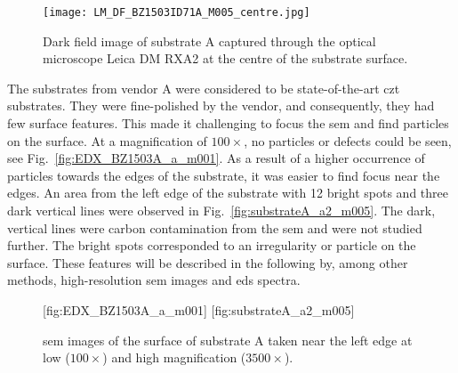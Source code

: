 \begin{figure}[htbp]
    \centering
    \texttt{[image: LM\_DF\_BZ1503ID71A\_M005\_centre.jpg]}
    \caption[Dark field image of substrate A.]{Dark field image of substrate A captured through the optical microscope Leica DM RXA2 at the centre of the substrate surface.}%
    \label{fig:subAa_om_df}
\end{figure}

The substrates from vendor A were considered to be state-of-the-art \ac{czt} substrates. They were fine-polished by the vendor, and consequently, they had few surface features. This made it challenging to focus the \ac{sem} and find particles on the surface. At a magnification of $100\times$, no particles or defects could be seen, see Fig.~\ref{fig:EDX_BZ1503A_a_m001}. As a result of a higher occurrence of particles towards the edges of the substrate, it was easier to find focus near the edges. An area from the left edge of the substrate with 12 bright spots and three dark vertical lines were observed in Fig.~\ref{fig:substrateA_a2_m005}. The dark, vertical lines were carbon contamination from the \ac{sem} and were not studied further. The bright spots corresponded to an irregularity or particle on the surface. These features will be described in the following by, among other methods, high-resolution \ac{sem} images and \ac{eds} spectra.

\begin{figure}[htbp]
    \centering
    [fig:EDX_BZ1503A_a_m001]
    \hfill
    [fig:substrateA_a2_m005]
    \caption[\Ac{sem} images of substrate A.]{\Ac{sem} images of the surface of substrate A taken near the left edge at  low ($100\times$) and  high magnification ($3500\times$).}
    \label{fig:subA_overview}
\end{figure}


